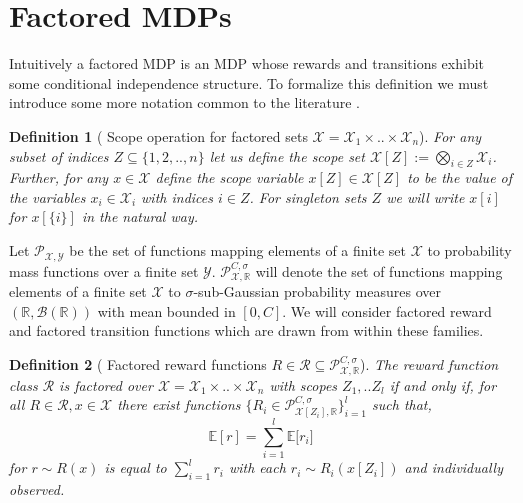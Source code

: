 \documentclass{article}
\newtheorem{mydef}{Definition}
\newcommand{\Exp}{\mathds{E}}
\newcommand{\Real}{\mathds{R}}
\newcommand{\Xc}{\mathcal{X}}
\newcommand{\Yc}{\mathcal{Y}}
\newcommand{\Pc}{\mathcal{P}}
\newcommand{\Rc}{\mathcal{R}}
\begin{document}
\section{Factored MDPs}

Intuitively a factored MDP is an MDP whose rewards and transitions exhibit some conditional independence structure.
To formalize this definition we must introduce some more notation common to the literature \cite{szita2009optimistic}.

\begin{mydef}[ Scope operation for factored sets $\Xc = \Xc_1 \times .. \times \Xc_n$]
\hspace{0.000000001mm} \newline
For any subset of indices $Z \subseteq \{1,2,..,n\}$ let us define the scope set $\Xc[Z] := \bigotimes\limits_{i \in Z} \Xc_i$.
Further, for any $x \in \Xc$ define the scope variable $x[Z] \in \Xc[Z] $ to be the value of the variables $x_i \in \Xc_i$ with indices $i \in Z$.
For singleton sets $Z$ we will write $x[i]$ for $x[\{ i \}]$ in the natural way.
\end{mydef}


Let $\Pc_{\Xc,\Yc}$ be the set of functions mapping elements of a finite set $\Xc$ to probability mass functions over a finite set $\Yc$.
$\Pc^{C,\sigma}_{\Xc,\Real}$ will denote the set of functions mapping elements of a finite set $\Xc$ to $\sigma$-sub-Gaussian probability measures over $(\Real, \mathcal{B}(\Real))$ with mean bounded in $[0,C]$.
We will consider factored reward and factored transition functions which are drawn from within these families.

\begin{mydef}[ Factored reward functions $R \in \Rc \subseteq \Pc^{C,\sigma}_{\Xc,\Real} $]
\hspace{0.000000001mm} \newline
The reward function class $\Rc$ is factored over $\Xc = \Xc_1 \times .. \times \Xc_n $ with scopes $Z_1, .. Z_l$ if and only if, 
for all $R \in \Rc, x \in \Xc$ there exist functions $\{R_i \in \Pc^{C,\sigma}_{\Xc [ Z_i] ,\Real} \}_{i=1}^l $ such that,
$$ \Exp [ r ] = \sum_{i=1}^l \Exp\big[ r_i \big] $$
for $r \sim R(x)$ is equal to $\sum_{i=1}^l r_i$ with each $r_i \sim R_i(x[Z_i])$ and individually observed.
\end{mydef}
\end{document}
